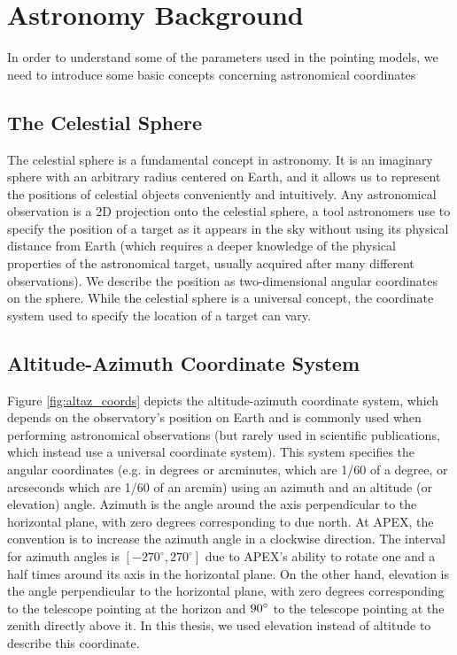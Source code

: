 \newpage

\section{Astronomy Background}\label{sec:ast_terms}
In order to understand some of the parameters used in the pointing models, we need to introduce some basic concepts concerning astronomical coordinates 
\subsection{The Celestial Sphere}
The celestial sphere is a fundamental concept in astronomy.
It is an imaginary sphere with an arbitrary radius centered on Earth, and it allows us to represent the positions of celestial objects conveniently and intuitively.
Any astronomical observation is a 2D projection onto the celestial sphere,
a tool astronomers use to specify the position of a target as it appears in the sky without using its physical distance from Earth
(which requires a deeper knowledge of the physical properties of the astronomical target, usually acquired after many different observations).
We describe the position as two-dimensional angular coordinates on the sphere.
While the celestial sphere is a universal concept, the coordinate system used to specify the location of a target can vary.




\subsection{Altitude-Azimuth Coordinate System}\label{sec:altaz_coords}
Figure \ref{fig:altaz_coords} depicts the altitude-azimuth coordinate system,
which depends on the observatory's position on Earth and is commonly used when performing astronomical observations
(but rarely used in scientific publications, which instead use a universal coordinate system).
This system specifies the angular coordinates (e.g. in degrees or arcminutes, which are 1/60 of a degree, or arcseconds which are 1/60 of an arcmin)
using an azimuth and an altitude (or elevation) angle.
Azimuth is the angle around the axis perpendicular to the horizontal plane, with zero degrees corresponding to due north.
At APEX, the convention is to increase the azimuth angle in a clockwise direction.
The interval for azimuth angles is $[-270^\circ,270^\circ]$ due to APEX's ability to rotate one and a half times around its axis in the horizontal plane.
On the other hand, elevation is the angle perpendicular to the horizontal plane, with zero degrees corresponding to the telescope pointing at the horizon and $90^\circ$ to the telescope pointing at the zenith directly above it.
In this thesis, we used elevation instead of altitude to describe this coordinate.\\


